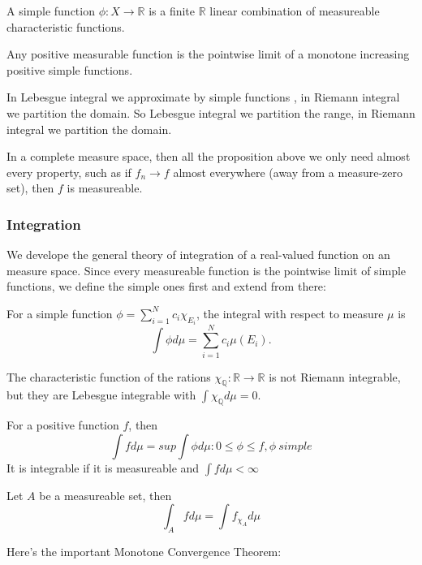 \documentclass[main.tex]{subfiles}
\begin{document}
\begin{definition}
A simple function $\phi: X \rightarrow \mathbb{R}$ is a finite $\mathbb{R}$ linear combination of measureable characteristic functions.
\end{definition}


\begin{theorem}
Any positive measurable function is the pointwise limit of a monotone increasing positive simple functions. 
\end{theorem}

\begin{remark}
In Lebesgue integral we approximate by simple functions , in Riemann integral we partition the domain. So Lebesgue integral we partition the range, in Riemann integral we partition the domain.
\end{remark}

In a complete measure space, then all the proposition above we only need almost every property, such as if $f_n \rightarrow f$ almost everywhere (away from a measure-zero set), then $f$ is measureable.


\subsubsection{Integration}

We develope the general theory of integration of a real-valued function on an measure space. Since every measureable function is the pointwise limit of simple functions, we define the simple ones first and extend from there:

For a simple function $\phi = \sum_{i = 1} ^N c_i \chi_{E_i}$, the integral with respect to measure $\mu$ is 
$$
\int \phi d\mu = \sum_{i = 1} ^N c_i \mu(E_i).
$$

\begin{example}
The characteristic function of the rations $\chi_\mathbb{Q}: \mathbb{R} \rightarrow \mathbb{R}$ is not Riemann integrable, but they are Lebesgue integrable with $\int \chi_\mathbb{Q} d\mu = 0$.
\end{example}

For a positive function $f$, then 
$$
\int f d\mu = sup{\int \phi d\mu: 0 \leq \phi \leq f, \phi \ simple}
$$
It is integrable if it is measureable and $\int f d\mu < \infty$


Let $A$ be a measureable set, then 
$$
\int_A f d\mu = \int f_{\chi_A}d\mu
$$

Here's the important Monotone Convergence Theorem:
\end{document}
